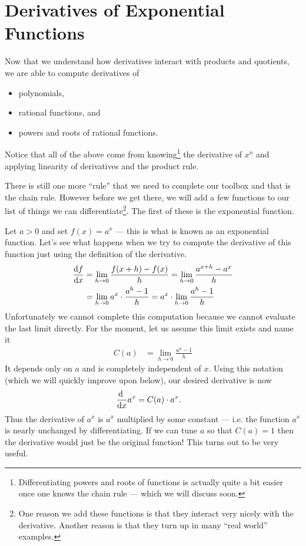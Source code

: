 \section{Derivatives of Exponential Functions}\label{sec exp func}
Now that we understand how derivatives interact with products and quotients, we
are able to compute derivatives of
\begin{itemize}
 \item polynomials,
 \item rational functions, and
 \item powers and roots of rational functions.
\end{itemize}
Notice that all of the above come from knowing\footnote{Differentiating powers
and roots of functions is actually quite a bit easier once one knows the chain
rule --- which we will discuss soon.} the derivative of $x^n$ and applying
linearity of derivatives and the product rule.

There is still one more ``rule'' that we need to complete our toolbox and that
is the chain rule. However before we get there, we will add a few functions
to our list of things we can differentiate\footnote{One reason we add these
functions is that they interact very nicely with the derivative. Another
reason is that they turn up in many ``real world'' examples.}. The
first of these is the exponential function.


Let $a>0$ and set $f(x) = a^x$ --- this is what is known as an
exponential function. Let's see what happens when we try to compute
the derivative of this function just using the definition of the derivative.
\begin{align*}
  \diff{f}{x} &= \lim_{h \to 0} \frac{f(x+h) - f(x)}{h}
  = \lim_{h \to 0} \frac{a^{x+h} - a^x}{h} \\
  &= \lim_{h \to 0} a^x \cdot \frac{a^{h} - 1}{h}
  = a^x \cdot \lim_{h \to 0} \frac{a^{h} - 1}{h}
\end{align*}
Unfortunately we cannot complete this computation because we cannot evaluate the
last
limit directly. For the moment, let us assume this limit exists and name it
\begin{align*}
  C(a) &= \lim_{h \to 0} \frac{a^{h} - 1}{h}
\end{align*}
It depends only on $a$ and is completely independent of $x$. Using  this
notation (which
we will quickly improve upon below), our desired derivative is now
\begin{align*}
  \diff{}{x}a^x &=  C(a)\cdot a^x.
\end{align*}
Thus the derivative of $a^x$ is $a^x$ multiplied by some constant --- i.e. the
function
$a^x$ is nearly unchanged by differentiating. If we can tune $a$ so that $C(a) =
1$ then the derivative would just be the original function! This turns out to be
very useful.

